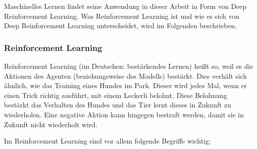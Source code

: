 Maschinelles Lernen findet seine Anwendung in dieser Arbeit in Form von Deep Reinforcement Learning. Was Reinforcement Learning ist und wie es sich von Deep Reinforcement Learning unterscheidet, wird im Folgenden beschrieben.

\newpage
\subsubsection{Reinforcement Learning}
Reinforcement Learning (im Deutschen: bestärkendes Lernen) heißt so, weil es die Aktionen des Agenten (beziehungsweise des Modells) bestärkt. Dies verhält sich ähnlich, wie das Training eines Hundes im Park. Dieser wird jedes Mal, wenn er einen Trick richtig ausführt, mit einem Leckerli belohnt. Diese Belohnung bestärkt das Verhalten des Hundes und das Tier lernt dieses in Zukunft zu wiederholen. Eine negative Aktion kann hingegen bestraft werden, damit sie in Zukunft nicht wiederholt wird. \cite[S. 11]{ris-ala_fundamentals_2023}

Im Reinforcement Learning sind vor allem folgende Begriffe wichtig:

